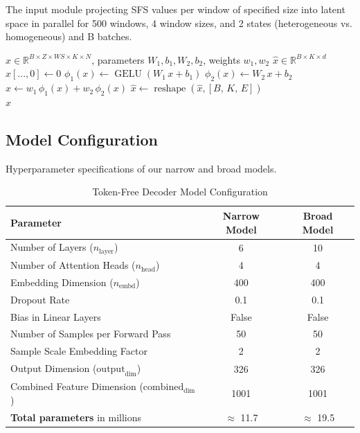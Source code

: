 \documentclass[9pt,twoside]{pnas-new}
\begin{document}
The input module projecting SFS values per window of specified size into latent space in parallel for 500 windows, 4 window sizes, and 2 states (heterogeneous vs. homogeneous) and B batches.

\nopagebreak[4]

\begin{algorithm}[H]
\caption{ProjectionReplacingEmbeddingTable}\label{alg:projEmbed}
\begin{algorithmic}[1]
\Require $x \in \mathbb{R}^{B \times Z \times  WS \times K \times N}$, parameters $W_1, b_1, W_2, b_2$, weights $w_1, w_2$
\Ensure $\hat{x} \in \mathbb{R}^{B \times K \times d}$
\State $x[...,0] \gets 0$
\State $\phi_1(x) \gets \operatorname{GELU}(W_1\,x + b_1)$
\State $\phi_2(x) \gets W_2\,x + b_2$
\State $\hat{x} \gets w_1\,\phi_1(x) + w_2\,\phi_2(x)$ 
\State $\hat{x} \gets \operatorname{reshape}(\hat{x}, [B,\,K,\,E])$ \\
\Return $\hat{x}$
\end{algorithmic}
\end{algorithm}


\subsection*{Model Configuration}

Hyperparameter specifications of our narrow and broad models.

\begin{table}[ht]
    \centering
    \caption{Token-Free Decoder Model Configuration}
    \label{tab:model-config}
    \begin{tabular}{lcc}
        \toprule
        \textbf{Parameter} & \textbf{Narrow Model} & \textbf{Broad Model} \\
        \midrule
        Number of Layers ($n_{\text{layer}}$)              & 6 & 10 \\
        Number of Attention Heads ($n_{\text{head}}$)       & 4 & 4 \\
        Embedding Dimension ($n_{\text{embd}}$)             & 400 & 400 \\
        Dropout Rate                                        & 0.1 & 0.1 \\
        Bias in Linear Layers                               & False & False \\
        Number of Samples per Forward Pass                & 50 & 50 \\
        Sample Scale Embedding Factor                       & 2 & 2 \\
        Output Dimension ($\text{output}_{\text{dim}}$)     & 326 & 326 \\
        Combined Feature Dimension (${\text{combined}}_{\text{dim}}$) & 1001 & 1001 \\
        \textbf{Total parameters} in millions & $\approx$ 11.7 & $\approx$ 19.5 \\
        \bottomrule
    \end{tabular}
\end{table}
\end{document}
